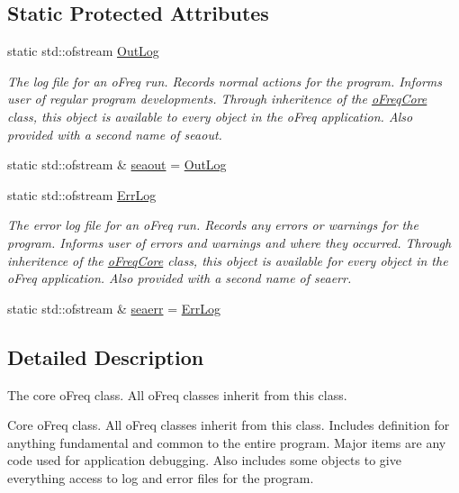 \subsection*{Static Protected Attributes}
\begin{DoxyCompactItemize}
\item 
static std\-::ofstream \hyperlink{classosea_1_1ofreq_1_1o_freq_core_a85b3e812b6d78c064ba375d5101bb053}{Out\-Log}
\begin{DoxyCompactList}\small\item\em The log file for an o\-Freq run. Records normal actions for the program. Informs user of regular program developments. Through inheritence of the \hyperlink{classosea_1_1ofreq_1_1o_freq_core}{o\-Freq\-Core} class, this object is available to every object in the o\-Freq application. Also provided with a second name of seaout. \end{DoxyCompactList}\item 
static std\-::ofstream \& \hyperlink{classosea_1_1ofreq_1_1o_freq_core_ad1092650d598d7f30e7c0fb3dbdfd392}{seaout} = \hyperlink{classosea_1_1ofreq_1_1o_freq_core_a85b3e812b6d78c064ba375d5101bb053}{Out\-Log}
\item 
static std\-::ofstream \hyperlink{classosea_1_1ofreq_1_1o_freq_core_a5e31044ee80fa436289e569c8080b21e}{Err\-Log}
\begin{DoxyCompactList}\small\item\em The error log file for an o\-Freq run. Records any errors or warnings for the program. Informs user of errors and warnings and where they occurred. Through inheritence of the \hyperlink{classosea_1_1ofreq_1_1o_freq_core}{o\-Freq\-Core} class, this object is available for every object in the o\-Freq application. Also provided with a second name of seaerr. \end{DoxyCompactList}\item 
static std\-::ofstream \& \hyperlink{classosea_1_1ofreq_1_1o_freq_core_aec5a7ac06574b9c5f80ac3c149c09fda}{seaerr} = \hyperlink{classosea_1_1ofreq_1_1o_freq_core_a5e31044ee80fa436289e569c8080b21e}{Err\-Log}
\end{DoxyCompactItemize}


\subsection{Detailed Description}
The core o\-Freq class. All o\-Freq classes inherit from this class. 

Core o\-Freq class. All o\-Freq classes inherit from this class. Includes definition for anything fundamental and common to the entire program. Major items are any code used for application debugging. Also includes some objects to give everything access to log and error files for the program. 

